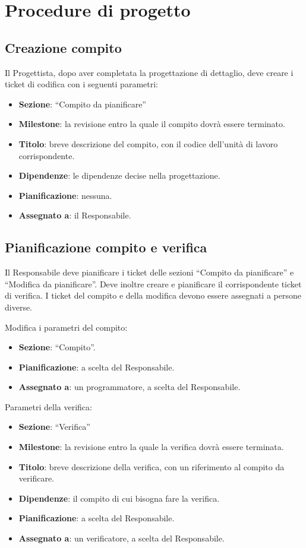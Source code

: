 \section{Procedure di progetto}
\label{procedurediprogetto}

\subsection{Creazione compito}

Il Progettista, dopo aver completata la progettazione di dettaglio, deve creare i ticket di codifica con i seguenti parametri:
\begin{itemize}
 \item \textbf{Sezione}: ``Compito da pianificare''
 \item \textbf{Milestone}: la revisione entro la quale il compito dovrà essere terminato.
 \item \textbf{Titolo}: breve descrizione del compito, con il codice dell'unità di lavoro corrispondente.
 \item \textbf{Dipendenze}: le dipendenze decise nella progettazione.
 \item \textbf{Pianificazione}: nessuna.
 \item \textbf{Assegnato a}: il Responsabile.
\end{itemize}

\subsection{Pianificazione compito e verifica}

\label{pianificazione}
Il Responsabile deve pianificare i ticket delle sezioni ``Compito da pianificare'' e ``Modifica da pianificare''. Deve inoltre creare e pianificare il corrispondente ticket di verifica. I ticket del compito e della modifica devono essere assegnati a persone diverse.

Modifica i parametri del compito:
\begin{itemize}
 \item \textbf{Sezione}: ``Compito''.
 \item \textbf{Pianificazione}: a scelta del Responsabile.
 \item \textbf{Assegnato a}: un programmatore, a scelta del Responsabile.
\end{itemize}

Parametri della verifica:
\begin{itemize}
 \item \textbf{Sezione}: ``Verifica''
 \item \textbf{Milestone}: la revisione entro la quale la verifica dovrà essere terminata.
 \item \textbf{Titolo}: breve descrizione della verifica, con un riferimento al compito da verificare.
 \item \textbf{Dipendenze}: il compito di cui bisogna fare la verifica.
 \item \textbf{Pianificazione}: a scelta del Responsabile.
 \item \textbf{Assegnato a}: un verificatore, a scelta del Responsabile.
\end{itemize}

